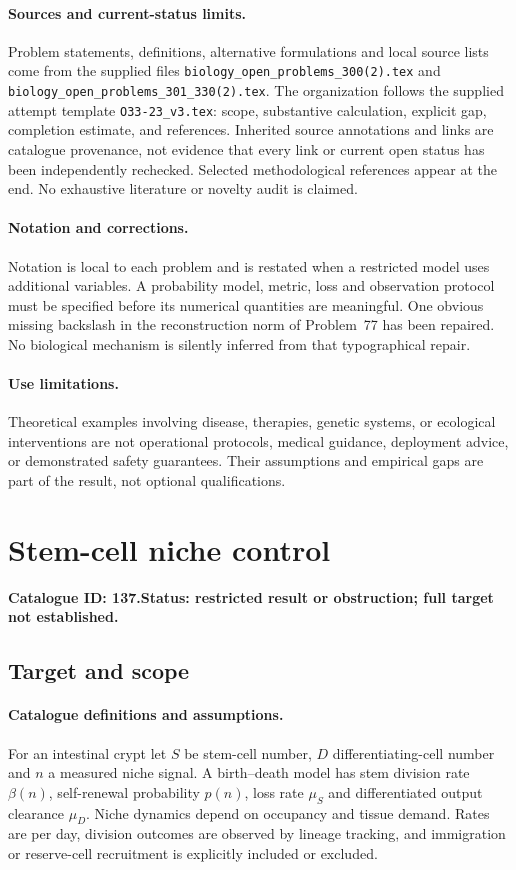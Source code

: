 \documentclass[11pt]{article}
\begin{document}
\paragraph{Sources and current-status limits.}
Problem statements, definitions, alternative formulations and local source lists
come from the supplied files
\texttt{biology\_open\_problems\_300(2).tex} and
\texttt{biology\_open\_problems\_301\_330(2).tex}.
The organization follows the supplied attempt template
\texttt{O33-23\_v3.tex}: scope, substantive calculation, explicit gap,
completion estimate, and references. Inherited source annotations and links are
catalogue provenance, not evidence that every link or current open status has
been independently rechecked. Selected methodological references appear at the
end. No exhaustive literature or novelty audit is claimed.

\paragraph{Notation and corrections.}
Notation is local to each problem and is restated when a restricted model uses
additional variables. A probability model, metric, loss and observation protocol
must be specified before its numerical quantities are meaningful. One obvious
missing backslash in the reconstruction norm of Problem~77 has been repaired.
No biological mechanism is silently inferred from that typographical repair.

\paragraph{Use limitations.}
Theoretical examples involving disease, therapies, genetic systems, or ecological
interventions are not operational protocols, medical guidance, deployment advice,
or demonstrated safety guarantees. Their assumptions and empirical gaps are part
of the result, not optional qualifications.

\setcounter{section}{136}
\section{Stem-cell niche control}
\label{prob:137}
\noindent\textbf{Catalogue ID: 137.}\quad \textbf{Status: restricted result or obstruction; full target not established.}
\subsection{Target and scope}
\paragraph{Catalogue definitions and assumptions.}
For an intestinal crypt let $S$ be stem-cell number, $D$ differentiating-cell number and $n$ a measured niche signal. A birth--death model has stem division rate $\beta(n)$, self-renewal probability $p(n)$, loss rate $\mu_S$ and differentiated output clearance $\mu_D$. Niche dynamics depend on occupancy and tissue demand. Rates are per day, division outcomes are observed by lineage tracking, and immigration or reserve-cell recruitment is explicitly included or excluded.
\end{document}
